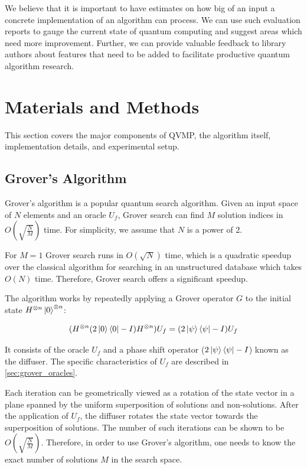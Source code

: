 \documentclass[11pt]{article}
\theoremstyle{definition}
\theoremstyle{remark}
\begin{document}
We believe that it is important to have estimates on how big of an input a
concrete implementation of an algorithm can process. We can use such evaluation
reports to gauge the current state of quantum computing and suggest areas which
need more improvement. Further, we can provide valuable feedback to library
authors about features that need to be added to facilitate productive quantum
algorithm research.

\section{Materials and Methods}

This section covers the major components of QVMP, the algorithm itself,
implementation details, and experimental setup.

\subsection{Grover's Algorithm}

Grover’s algorithm is a popular quantum search algorithm. Given an input space
of $N$ elements and an oracle $U_f$, Grover search can find $M$ solution
indices in $O(\sqrt{\frac{N}{M}})$ time. For simplicity, we assume that $N$ is
a power of 2. 

For $M = 1$ Grover search runs in $O(\sqrt{N})$ time, which is a quadratic
speedup over the classical algorithm for searching in an unstructured database
which takes $O(N)$ time. Therefore, Grover search offers a significant speedup.

The algorithm works by repeatedly applying a Grover operator $G$ to the initial
state $H^{\otimes n}\ket{0}^{\otimes n }$:

\begin{equation}
  (H^{\otimes n}(2\ket{0}\bra{0} - I)H^{\otimes n})U_f = (2\ket{\psi}\bra{\psi} - I)U_f
\end{equation}

It consists of the oracle $U_f$ and a phase shift operator
($2\ket{\psi}\bra{\psi} - I$) known as the diffuser. The specific
characteristics of $U_f$ are described in \ref{sec:grover_oracles}.

Each iteration can be geometrically viewed as a rotation of the state vector in
a plane spanned by the uniform superposition of solutions and non-solutions.
After the application of $U_f$, the diffuser rotates the state vector towards
the superposition of solutions. The number of such iterations can be shown to
be  $O(\sqrt{\frac{N}{M}})$. Therefore, in order to use Grover’s algorithm, one
needs to know the exact number of solutions $M$ in the search space.
\end{document}

